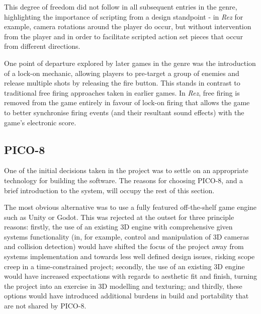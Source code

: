 \documentclass[11pt]{article}
\begin{document}
This degree of freedom did not follow in all subsequent entries in the genre, highlighting the importance
of scripting from a design standpoint - in \textit{Rez} for example, camera rotations around the player
do occur, but without intervention from the player and in order to facilitate scripted action
set pieces that occur from different directions.

One point of departure explored by later games in the genre was the introduction of a lock-on mechanic,
allowing players to pre-target a group of enemies and release multiple shots by releasing the fire button.
This stands in contrast to traditional free firing approaches taken in earlier games. In \textit{Rez},
free firing is removed from the game entirely in favour of lock-on firing that allows the game to
better synchronise firing events (and their resultant sound effects) with the game's electronic score.

\subsection{PICO-8}\label{pico}


One of the initial decisions taken in the project was to settle on an appropriate technology
for building the software. The reasons for choosing PICO-8, and a brief introduction to the
system, will occupy the rest of this section.

The most obvious alternative was to use a fully featured off-the-shelf game engine such as
Unity or Godot. This was rejected at the outset for three principle reasons: firstly, the
use of an existing 3D engine with comprehensive given systems functionality (in, for example,
control and manipulation of 3D cameras and collision detection) would have shifted the focus
of the project away from systems implementation and towards less well defined design issues,
risking scope creep in a time-constrained project; secondly, the use of an existing 3D engine
would have increased expectations with regards to aesthetic fit and finish,
turning the project into an exercise in 3D modelling and texturing; and thirdly, these options 
would have introduced additional burdens in build and portability that are not shared by PICO-8.
\end{document}
